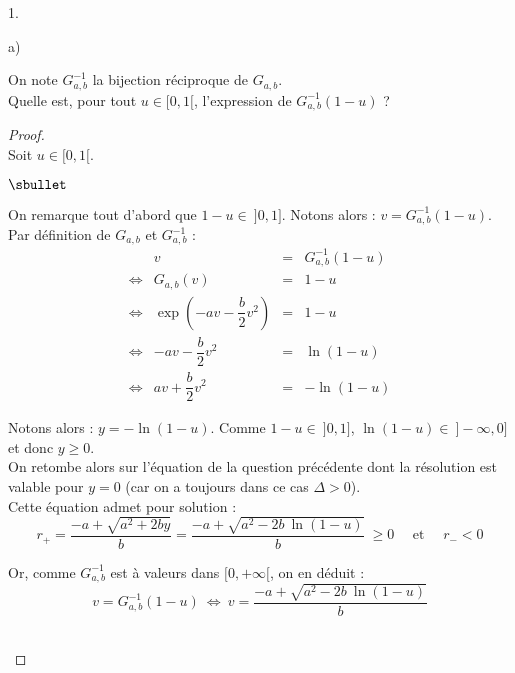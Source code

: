 \documentclass[11pt]{article}%
\begin{document}
\begin{noliste}{1.}
\begin{noliste}{a)}
  \item On note $G_{a,b}^{-1}$ la bijection réciproque de
    $G_{a,b}$. \\
    Quelle est, pour tout $u\in[0,1[$, l'expression de
    $G_{a,b}^{-1}(1-u)$ ?

    \begin{proof}~\\
      Soit $u \in [0, 1[$. 
      \begin{noliste}{$\sbullet$}
      \item On remarque tout d'abord que $1 - u \in \ ]0, 1]$. Notons
        alors : $v = G_{a,b}^{-1}(1-u)$. \\
        Par définition de $G_{a,b}$ et $G^{-1}_{a,b}$ :
        \[
        \begin{array}{crcl}
          & v & = & G^{-1}_{a,b}(1-u) \\[.4cm]
          \Leftrightarrow & G_{a,b}(v) & = & 1 - u \\[.4cm]
          \Leftrightarrow & \exp\left(- a v - \dfrac{b}{2} v^2 \right) &
          = & 1 - u \\[.4cm] 
          \Leftrightarrow & - a v - \dfrac{b}{2} v^2 & = & \ln(1 - u) \\[.4cm]
          \Leftrightarrow & a v + \dfrac{b}{2} v^2 & = & -\ln(1 - u) 
        \end{array}
        \]

      \item Notons alors : $y = -\ln(1-u)$. Comme $1-u \in \ ]0,1]$,
        $\ln(1-u) \in \ ]-\infty, 0]$ et donc $y \geq 0$.\\
        On retombe alors sur l'équation de la question précédente dont
        la résolution est valable pour $y = 0$ (car on a toujours dans
        ce cas $\Delta > 0$).\\
        Cette équation admet pour solution :
        \[
        r_+ = \dfrac{-a + \sqrt{a^2 + 2by}}{b} = \dfrac{-a + \sqrt{a^2
            - 2b \ \ln(1-u)}}{b} \ \geq 0 \quad \mbox{ et } \quad r_- < 0
        \]

      \item Or, comme $G^{-1}_{a,b}$ est à valeurs dans $[0, +\infty[$,
        on en déduit :
        \[
        v = G^{-1}_{a,b}(1-u) \ \Leftrightarrow \ v = \dfrac{-a +
          \sqrt{a^2 - 2b \ \ln(1-u)}}{b}
        \]
      \end{noliste}
      \conc{Pour tout $u \in [0,1[$, $G^{-1}_{a,b}(1-u) = \dfrac{-a +
          \sqrt{a^2 - 2b \ \ln(1-u)}}{b}$.}~\\[-1cm]
    \end{proof}
  \end{noliste}



\end{noliste}
\end{document}
